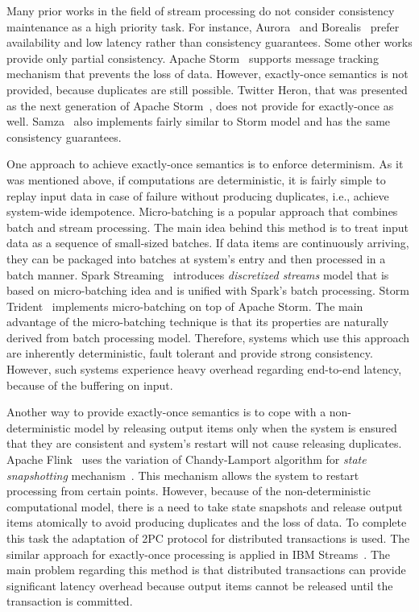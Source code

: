 
\label {fs-related-seciton}

Many prior works in the field of stream processing do not consider consistency maintenance as a high priority task. For instance, Aurora~\cite{Abadi:2003:ANM:950481.950485} and Borealis~\cite{abadi2005design} prefer availability and low latency rather than consistency guarantees. Some other works provide only partial consistency. Apache Storm~\cite{apache:storm} supports message tracking mechanism that prevents the loss of data. However, exactly-once semantics is not provided, because duplicates are still possible. Twitter Heron, that was presented as the next generation of Apache Storm~\cite{Kulkarni:2015:THS:2723372.2742788}, does not provide for exactly-once as well. Samza~\cite{Noghabi:2017:SSS:3137765.3137770} also implements fairly similar to Storm model and has the same consistency guarantees.  

One approach to achieve exactly-once semantics is to enforce determinism. As it was mentioned above, if computations are deterministic, it is fairly simple to replay input data in case of failure without producing duplicates, i.e., achieve system-wide idempotence. Micro-batching is a popular approach that combines batch and stream processing. The main idea behind this method is to treat input data as a sequence of small-sized batches. If data items are continuously arriving, they can be packaged into batches at system's entry and then processed in a batch manner. Spark Streaming~\cite{Zaharia:2012:DSE:2342763.2342773} introduces {\it discretized streams} model that is based on micro-batching idea and is unified with Spark's batch processing. Storm Trident~\cite{apache:storm:trident} implements micro-batching on top of Apache Storm. The main advantage of the micro-batching technique is that its properties are naturally derived from batch processing model. Therefore, systems which use this approach are inherently deterministic, fault tolerant and provide strong consistency. However, such systems experience heavy overhead regarding end-to-end latency, because of the buffering on input.

Another way to provide exactly-once semantics is to cope with a non-deterministic model by releasing output items only when the system is ensured that they are consistent and system's restart will not cause releasing duplicates. Apache Flink~\cite{Carbone:2017:SMA:3137765.3137777} uses the variation of Chandy-Lamport algorithm for {\it state snapshotting} mechanism~\cite{2015arXiv150608603C}. This mechanism allows the system to restart processing from certain points. However, because of the non-deterministic computational model, there is a need to take state snapshots and release output items atomically to avoid producing duplicates and the loss of data. To complete this task the adaptation of 2PC protocol for distributed transactions is used. The similar approach for exactly-once processing is applied in IBM Streams~\cite{jacques2016consistent}. The main problem regarding this method is that distributed transactions can provide significant latency overhead because output items cannot be released until the transaction is committed. 

